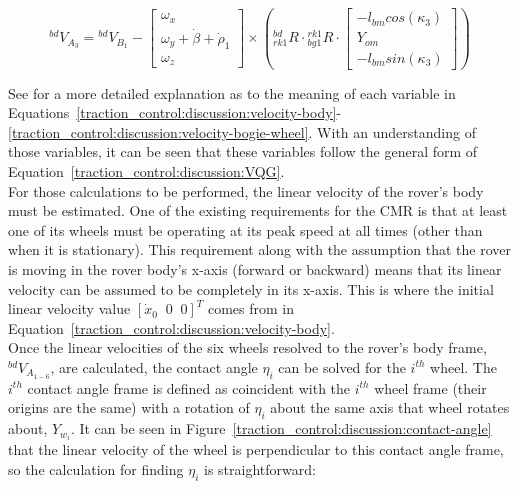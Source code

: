 \begin{equation}\label{traction_control:discussion:velocity-bogie-wheel}
	{}^{bd}V_{A_{3}} = {}^{bd}V_{B_{1}} - \left[\begin{array}{c}
		\omega_{x} \\
		\omega_{y} + \dot{\beta} + \dot{\rho}_{1} \\
		\omega_{z}
	\end{array}\right] \times \left({}^{bd}_{rk1}R \cdot {}^{rk1}_{bg1}R \cdot \left[\begin{array}{c}
		-l_{bm} cos(\kappa_{3}) \\
		Y_{om} \\
		-l_{bm} sin(\kappa_{3})
	\end{array}\right]\right)
\end{equation}

See \cite{tractl} for a more detailed explanation as to the meaning of each variable in Equations~\ref{traction_control:discussion:velocity-body}-\ref{traction_control:discussion:velocity-bogie-wheel}. With an understanding of those variables, it can be seen that these variables follow the general form of Equation~\ref{traction_control:discussion:VQG}. \\

For those calculations to be performed, the linear velocity of the rover's body must be estimated. One of the existing requirements for the \ac{CMR} is that at least one of its wheels must be operating at its peak speed at all times (other than when it is stationary). This requirement along with the assumption that the rover is moving in the rover body's x-axis (forward or backward) means that its linear velocity can be assumed to be completely in its x-axis. This is where the initial linear velocity value $\left[\dot{x}_0 \;\; 0 \;\; 0\right]^{T}$ comes from in Equation~\ref{traction_control:discussion:velocity-body}. \\

Once the linear velocities of the six wheels resolved to the rover's body frame, ${}^{bd}V_{A_{1-6}}$, are calculated, the contact angle $\eta_{i}$ can be solved for the $i^{th}$ wheel. The $i^{th}$ contact angle frame is defined as coincident with the $i^{th}$ wheel frame (their origins are the same) with a rotation of $\eta_{i}$ about the same axis that wheel rotates about, $Y_{w_{i}}$. It can be seen in Figure~\ref{traction_control:discussion:contact-angle} that the linear velocity of the wheel is perpendicular to this contact angle frame, so the calculation for finding $\eta_{i}$ is straightforward:


